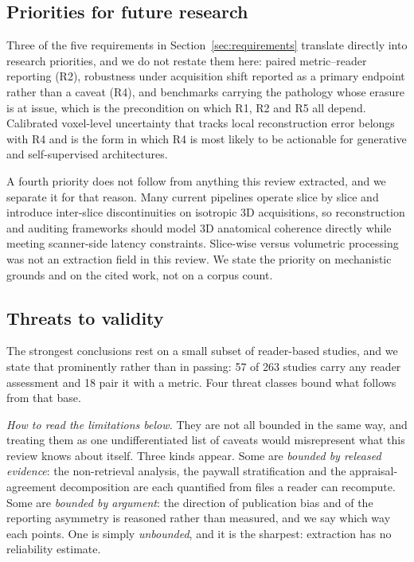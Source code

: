 \documentclass[review,authoryear]{elsarticle}
\begin{document}
\subsection{Priorities for future research}

Three of the five requirements in Section~\ref{sec:requirements} translate directly into
research priorities, and we do not restate them here: paired metric--reader reporting
(R2), robustness under acquisition shift reported as a primary endpoint rather than a
caveat (R4), and benchmarks carrying the pathology whose erasure is at issue, which is
the precondition on which R1, R2 and R5 all depend. Calibrated voxel-level uncertainty
that tracks local reconstruction error \citep{khawaled2024npbrec} belongs with R4 and is
the form in which R4 is most likely to be actionable for generative and self-supervised
architectures.

A fourth priority does not follow from anything this review extracted, and we separate
it for that reason. Many current pipelines operate slice by slice and introduce
inter-slice discontinuities on isotropic 3D acquisitions, so reconstruction and auditing
frameworks should model 3D anatomical coherence directly \citep{wei2026latent} while
meeting scanner-side latency constraints. Slice-wise versus volumetric processing was
not an extraction field in this review. We state the priority on mechanistic grounds and
on the cited work, not on a corpus count.

\subsection{Threats to validity}
\label{sec:threats}

The strongest conclusions rest on a small subset of reader-based studies, and we state
that prominently rather than in passing: 57 of 263 studies carry any reader assessment
and 18 pair it with a metric. Four threat classes bound what follows from that base.

\emph{How to read the limitations below.} They are not all bounded in the same way, and
treating them as one undifferentiated list of caveats would misrepresent what this review
knows about itself. Three kinds appear. Some are \emph{bounded by released evidence}: the
non-retrieval analysis, the paywall stratification and the appraisal-agreement
decomposition are each quantified from files a reader can recompute. Some are
\emph{bounded by argument}: the direction of publication bias and of the reporting
asymmetry is reasoned rather than measured, and we say which way each points. One is
simply \emph{unbounded}, and it is the sharpest: extraction has no reliability estimate.
\end{document}
